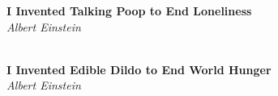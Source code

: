 \noindent\textbf{I Invented Talking Poop to End Loneliness}\\
\noindent\textit{Albert Einstein}\\
\\
\smallskip

\noindent\textbf{I Invented Edible Dildo to End World Hunger}\\
\noindent\textit{Albert Einstein}\\
\\
\\
\smallskip